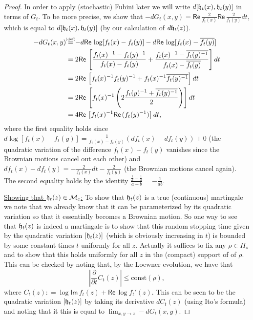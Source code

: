 \documentclass[11pt,reqno]{amsart}
\numberwithin{equation}{section}
\newcommand{\eqbydef}{\mathrel{\stackrel{\hspace*{-3mm}\text{\tiny(def)}\hspace*{-3mm}}{=}}}
\newcommand{\deq}{\mathrel{\mathop:}=}
\renewcommand{\Re}{\mathsf{Re}\,}
\renewcommand{\Im}{\mathsf{Im}\,}
\newcommand{\fh}{{\frak h}}
\begin{document}
\begin{proof}
	In order to apply (stochastic) Fubini later we will write $d[\fh_t(x),\fh_t(y)]$ in terms of $G_t$. To be more precise, we show that $-dG_t(x,y)=\Re\frac{2}{f_t(x)}\Re\frac{2}{f_t(y)}dt$, which is equal to $d[\fh_t(x),\fh_t(y)]$ (by our calculation of $d\fh_t(z)$).
	\begin{align*}
		-dG_t(x,y)&\eqbydef -d\Re\log[f_t(x)-f_t(y)]-d\Re\log[f_t(x)-\overline{f_t(y)}]\\
		&=2\Re\left[\frac{f_t(x)^{-1}-f_t(y)^{-1}}{f_t(x)-f_t(y)}+\frac{f_t(x)^{-1}-\overline{f_t(y)^{-1}}}{f_t(x)-\overline{f_t(y)}}\right]dt\\
		&=2\Re\left[f_t(x)^{-1}f_t(y)^{-1}+f_t(x)^{-1}\overline{f_t(y)^{-1}}\right]dt\\
		&=2\Re\left[f_t(x)^{-1}\left(2\frac{f_t(y)^{-1}+\overline{f_t(y)^{-1}}}{2}\right)\right]dt\\
		&=4\Re\left[f_t(x)^{-1}\Re(f_t(y)^{-1})\right]dt,
	\end{align*}
	where the first equality holds since $d\log[f_t(x)-f_t(y)]=\frac{1}{f_t(x)-f_t(y)}(df_t(x)-df_t(y))+0$ (the quadratic variation of the difference $f_t(x)-f_t(y)$ vanishes since the Brownian motions cancel out each other) and $df_t(x)-df_t(y)=-\frac{2}{f_t(x)}dt-\frac{2}{f_t(y)}$ (the Brownian motions cancel again). The second equality holds by the identity $\frac{\frac{1}{a}-\frac{1}{b}}{a-b}=-\frac{1}{ab}$.
	
	\underline{Showing that $\fh_t(z)\in\mathcal M_c$:} To show that $\fh_t(z)$ is a true (continuous) martingale we note that we already know that it can be parameterized by its quadratic variation so that it essentially becomes a Brownian motion. So one way to see that $\fh_t(z)$ is indeed a martingale is to show that this random stopping time given by the quadratic variation $[\fh_t(z)]$ (which is obviously increasing in $t$) is bounded by some constant times $t$ uniformly for all $z$. Actually it suffices to fix any $\rho\in H_s$ and to show that this holds uniformly for all $z$ in the (compact) support of of $\rho$. This can be checked by noting that, by the Loewner evolution, we have that $$|\frac{\partial}{\partial t} C_t(z)|\leq \text{const}(\rho),$$ where $C_t(z)\deq \log\Im f_t(z)+\Re\log f_t'(z)$. This can be seen to be the quadratic variation $[\fh_t(z)]$ by taking its derivative $dC_t(z)$ (using Ito's formula) and noting that it this is equal to $\lim_{x,y\rightarrow z} -dG_t(x,y)$.
	

\end{proof}
\end{document}
